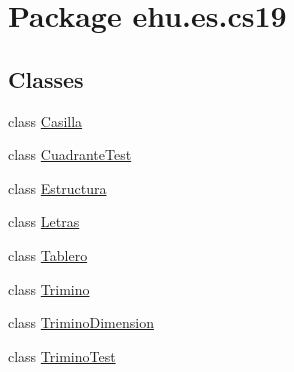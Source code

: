\hypertarget{namespaceehu_1_1es_1_1cs19}{}\section{Package ehu.\+es.\+cs19}
\label{namespaceehu_1_1es_1_1cs19}
\subsection*{Classes}
\begin{DoxyCompactItemize}
\item 
class \mbox{\hyperlink{classehu_1_1es_1_1cs19_1_1_casilla}{Casilla}}
\item 
class \mbox{\hyperlink{classehu_1_1es_1_1cs19_1_1_cuadrante_test}{Cuadrante\+Test}}
\item 
class \mbox{\hyperlink{classehu_1_1es_1_1cs19_1_1_estructura}{Estructura}}
\item 
class \mbox{\hyperlink{classehu_1_1es_1_1cs19_1_1_letras}{Letras}}
\item 
class \mbox{\hyperlink{classehu_1_1es_1_1cs19_1_1_tablero}{Tablero}}
\item 
class \mbox{\hyperlink{classehu_1_1es_1_1cs19_1_1_trimino}{Trimino}}
\item 
class \mbox{\hyperlink{classehu_1_1es_1_1cs19_1_1_trimino_dimension}{Trimino\+Dimension}}
\item 
class \mbox{\hyperlink{classehu_1_1es_1_1cs19_1_1_trimino_test}{Trimino\+Test}}
\end{DoxyCompactItemize}
